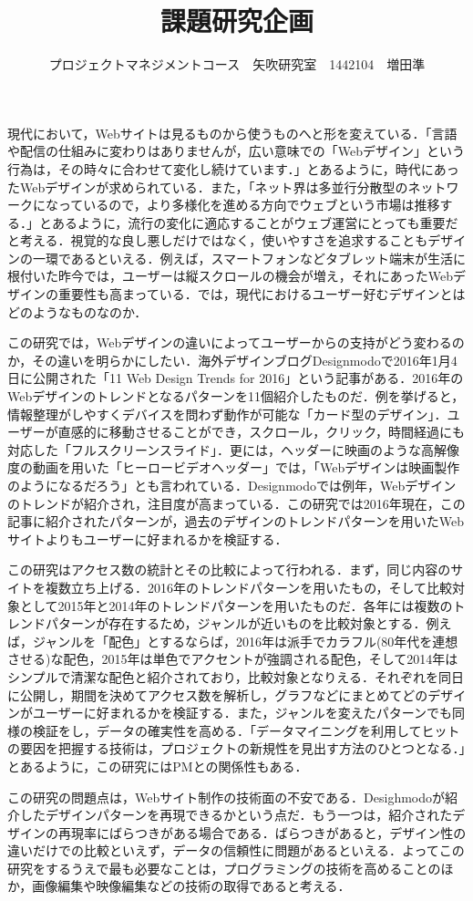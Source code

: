 \documentclass[uplatex,twocolumn,dvipdfmx]{jsarticle}
\title{\vspace{-5mm}\fontsize{14pt}{0pt}\selectfont 課題研究企画}
\author{\normalsize プロジェクトマネジメントコース　矢吹研究室　1442104　増田準}
\date{}
\begin{document}
\fontsize{10.5pt}{\baselineskip}\selectfont
\maketitle





現代において，Webサイトは見るものから使うものへと形を変えている．「言語や配信の仕組みに変わりはありませんが，広い意味での「Webデザイン」という行為は，その時々に合わせて変化し続けています．\cite{bib001}」とあるように，時代にあったWebデザインが求められている．また，「ネット界は多並行分散型のネットワークになっているので，より多様化を進める方向でウェブという市場は推移する．\cite{bib002}」とあるように，流行の変化に適応することがウェブ運営にとっても重要だと考える．視覚的な良し悪しだけではなく，使いやすさを追求することもデザインの一環であるといえる．例えば，スマートフォンなどタブレット端末が生活に根付いた昨今では，ユーザーは縦スクロールの機会が増え，それにあったWebデザインの重要性も高まっている．では，現代におけるユーザー好むデザインとはどのようなものなのか．

この研究では，Webデザインの違いによってユーザーからの支持がどう変わるのか，その違いを明らかにしたい．海外デザインブログDesignmodoで2016年1月4日に公開された「11 Web Design Trends for 2016\cite{bib004}」という記事がある．2016年のWebデザインのトレンドとなるパターンを11個紹介したものだ．例を挙げると，情報整理がしやすくデバイスを問わず動作が可能な「カード型のデザイン」．ユーザーが直感的に移動させることができ，スクロール，クリック，時間経過にも対応した「フルスクリーンスライド」．更には，ヘッダーに映画のような高解像度の動画を用いた「ヒーロービデオヘッダー」では，「Webデザインは映画製作のようになるだろう」とも言われている．Designmodoでは例年，Webデザインのトレンドが紹介され，注目度が高まっている．この研究では2016年現在，この記事に紹介されたパターンが，過去のデザインのトレンドパターンを用いたWebサイトよりもユーザーに好まれるかを検証する．

この研究はアクセス数の統計とその比較によって行われる．まず，同じ内容のサイトを複数立ち上げる．2016年のトレンドパターンを用いたもの，そして比較対象として2015年と2014年のトレンドパターンを用いたものだ．各年には複数のトレンドパターンが存在するため，ジャンルが近いものを比較対象とする．例えば，ジャンルを「配色」とするならば，2016年は派手でカラフル(80年代を連想させる)な配色，2015年は単色でアクセントが強調される配色，そして2014年はシンプルで清潔な配色と紹介されており，比較対象となりえる．それぞれを同日に公開し，期間を決めてアクセス数を解析し，グラフなどにまとめてどのデザインがユーザーに好まれるかを検証する．また，ジャンルを変えたパターンでも同様の検証をし，データの確実性を高める．「データマイニングを利用してヒットの要因を把握する技術は，プロジェクトの新規性を見出す方法のひとつとなる．\cite{bib003}」とあるように，この研究にはPMとの関係性もある．

この研究の問題点は，Webサイト制作の技術面の不安である．Desighmodoが紹介したデザインパターンを再現できるかという点だ．もう一つは，紹介されたデザインの再現率にばらつきがある場合である．ばらつきがあると，デザイン性の違いだけでの比較といえず，データの信頼性に問題があるといえる．よってこの研究をするうえで最も必要なことは，プログラミングの技術を高めることのほか，画像編集や映像編集などの技術の取得であると考える．



\end{document}
